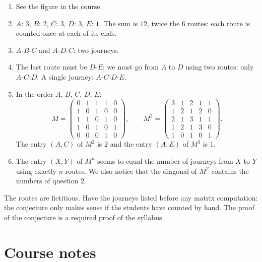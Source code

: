 \begin{solution}[Activity]
\begin{enumerate}
\item See the figure in the course.
\item $A$: $3$, $B$: $2$, $C$: $3$, $D$: $3$, $E$: $1$. The sum is $12$, twice the $6$ routes: each route is counted once at each of its ends.
\item $A$-$B$-$C$ and $A$-$D$-$C$: two journeys.
\item The last route must be $D$-$E$; we must go from $A$ to $D$ using two routes: only $A$-$C$-$D$. A single journey: $A$-$C$-$D$-$E$.
\item In the order $A$, $B$, $C$, $D$, $E$:
\[M=\begin{pmatrix}0&1&1&1&0\\1&0&1&0&0\\1&1&0&1&0\\1&0&1&0&1\\0&0&0&1&0\end{pmatrix},\qquad M^2=\begin{pmatrix}3&1&2&1&1\\1&2&1&2&0\\2&1&3&1&1\\1&2&1&3&0\\1&0&1&0&1\end{pmatrix}.\]
The entry $(A,C)$ of $M^2$ is $2$ and the entry $(A,E)$ of $M^3$ is $1$.
\item The entry $(X,Y)$ of $M^n$ seems to equal the number of journeys from $X$ to $Y$ using exactly $n$ routes. We also notice that the diagonal of $M^2$ contains the numbers of question 2.
\end{enumerate}
\end{solution}
\begin{teachernote}
The routes are fictitious. Have the journeys listed before any matrix computation: the conjecture only makes sense if the students have counted by hand. The proof of the conjecture is a required proof of the syllabus.
\end{teachernote}

\mxnewpage
\section{Course notes}
